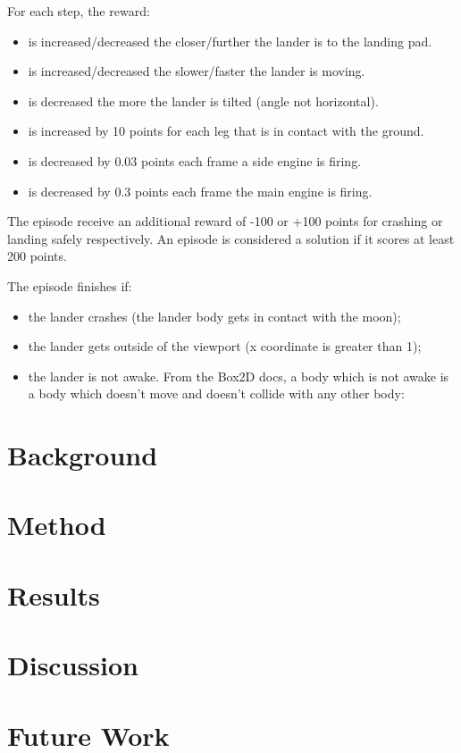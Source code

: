 \documentclass{article}
\begin{document}
For each step, the reward:
\begin{itemize}
  \item is increased/decreased the closer/further the lander is to the landing pad.
  \item is increased/decreased the slower/faster the lander is moving.
  \item is decreased the more the lander is tilted (angle not horizontal).
  \item is increased by 10 points for each leg that is in contact with the ground.
  \item is decreased by 0.03 points each frame a side engine is firing.
  \item is decreased by 0.3 points each frame the main engine is firing.
\end{itemize}

The episode receive an additional reward of -100 or +100 points for crashing or landing safely respectively. An episode is considered a solution if it scores at least 200 points.

The episode finishes if:
\begin{itemize}
  \item the lander crashes (the lander body gets in contact with the moon);
  \item the lander gets outside of the viewport (x coordinate is greater than 1);
  \item the lander is not awake. From the Box2D docs, a body which is not awake is a body which doesn’t move and doesn’t collide with any other body:
\end{itemize}

\section{Background}

\section{Method}

\section{Results}

\section{Discussion}

\section{Future Work}
\end{document}
